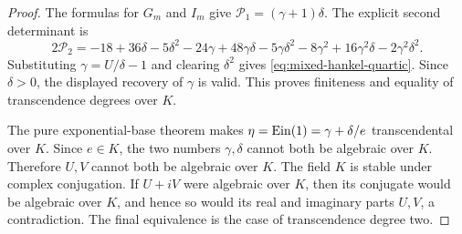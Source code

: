 \begin{proof}
The formulas for $G_m$ and $I_m$ give
$\mathcal P_1=(\gamma+1)\delta$.  The explicit second determinant is
\[
 2\mathcal P_2=-18+36\delta-5\delta^2-24\gamma
 +48\gamma\delta-5\gamma\delta^2-8\gamma^2
 +16\gamma^2\delta-2\gamma^2\delta^2.
\]
Substituting $\gamma=U/\delta-1$ and clearing $\delta^2$ gives
\eqref{eq:mixed-hankel-quartic}.  Since $\delta>0$, the displayed
recovery of $\gamma$ is valid.  This proves finiteness and equality of
transcendence degrees over $K$.

The pure exponential-base theorem makes
$\eta=\operatorname{Ein}(1)=\gamma+\delta/e$ transcendental over $K$.  Since $e\in K$,
the two numbers $\gamma,\delta$ cannot both be algebraic over $K$.
Therefore $U,V$ cannot both be algebraic over $K$.  The field $K$ is
stable under complex conjugation.  If $U+iV$ were algebraic over $K$,
then its conjugate would be algebraic over $K$, and hence so would its
real and imaginary parts $U,V$, a contradiction.  The final equivalence
is the case of transcendence degree two.
\end{proof}
